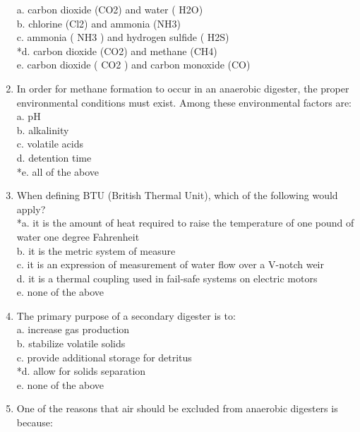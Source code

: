 \documentclass{article}
\begin{document}
\begin{enumerate}
a. carbon dioxide (CO2) and water ( H2O) \\
b. chlorine (Cl2) and ammonia (NH3) \\
c. ammonia ( NH3 ) and hydrogen sulfide ( H2S) \\
*d. carbon dioxide (CO2) and methane (CH4) \\
e. carbon dioxide ( CO2 ) and carbon monoxide (CO) \\

\item  In order for methane formation to occur in an anaerobic digester, the proper environmental conditions must exist.  Among these environmental factors are: \\

a. pH \\
b. alkalinity \\
c. volatile acids \\
d. detention time \\
*e. all of the above \\

\item  When defining BTU (British Thermal Unit), which of the following would apply? \\

*a. it is the amount of heat required to raise the temperature of one pound of water one degree Fahrenheit \\
b. it is the metric system of measure \\
c. it is an expression of measurement of water flow over a V-notch weir \\
d. it is a thermal coupling used in fail-safe systems on electric motors \\
e. none of the above \\

\item  The primary purpose of a secondary digester is to: \\

a. increase gas production \\
b. stabilize volatile solids \\
c. provide additional storage for detritus \\
*d. allow for solids separation \\
e. none of the above \\

\item  One of the reasons that air should be excluded from anaerobic digesters is because: \\


\end{enumerate}
\end{document}
